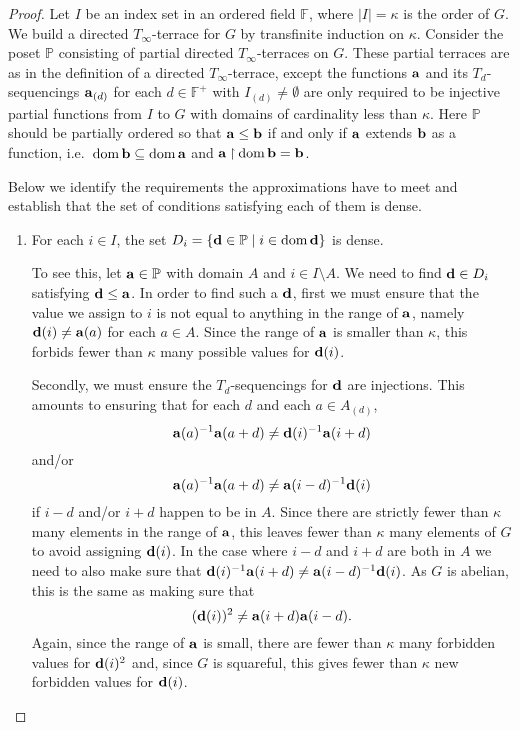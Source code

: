 \documentclass[12pt,a4paper]{article}
\newcommand{\F}{\mathbb{F}}
\DeclareMathOperator{\dom}{dom}
\newcommand{\rest}{\mathbin{\upharpoonright}}
\newcommand{\st}{\; | \;}
\newcommand{\set}[2]{\left\{#1\st #2 \right\}}
\renewcommand{\P}{\mathbb{P}}
\renewcommand{\a}{\textup{\textbf{a}}}
\renewcommand{\b}{\textup{\textbf{b}}}
\renewcommand{\d}{\textup{\textbf{d}}}
\begin{document}
\begin{proof}
Let $I$ be an index set in an ordered field $\F$, where $|I|=\kappa$ is the order of $G$. We build a directed $T_\infty$-terrace for $G$ by transfinite induction on $\kappa$. Consider the poset $\P$ consisting of partial directed $T_\infty$-terraces on $G$. These partial terraces are as in the definition of a directed $T_\infty$-terrace, except the functions $\a$ and its $T_d$-sequencings $\a_{(d)}$ for each $d \in \F^+$ with $I_{(d)} \neq \emptyset$ are only required to be injective partial functions from $I$ to $G$ with domains of cardinality less than $\kappa$. Here $\P$ should be partially ordered so that $\a \leq \b$ if and only if $\a$ extends $\b$ as a function, i.e.\ $\dom \b \subseteq \dom \a$ and $\a \rest \dom \b = \b$.

Below we identify the requirements the approximations have to meet and establish that the set of conditions satisfying each of them is dense.

\begin{enumerate}
	\item \label{item:DomainDense} For each $i \in I$, the set $D_i=\set{\d \in \P}{i \in \dom \d }$ is dense. 
	
	To see this, let $\a \in \P$ with domain $A$ and $i \in I \setminus A$. We need to find $\d \in D_i$ satisfying $\d \leq \a$. In order to find such a $\d$, first we must ensure that the value we assign to $i$ is not equal to anything in the range of $\a$, namely $\d(i) \neq \a(a)$ for each $a \in A$.
	Since the range of \(\a\) is smaller than \(\kappa\), this forbids fewer than \(\kappa\) many possible values for \(\d(i)\).
	
	Secondly, we must ensure the $T_d$-sequencings for $\d$ are injections. This amounts to ensuring that for each \(d\) and each $a \in A_{(d)}$, 
		$$\a(a)^{-1}\a(a+d) \neq \d(i)^{-1}\a(i+d)$$ and/or
		$$\a(a)^{-1}\a(a+d) \neq \a(i-d)^{-1}\d(i)$$ if $i-d$ and/or $i+d$ happen to be in $A$. Since there are strictly fewer than $\kappa$ many elements in the range of $\a$, this leaves fewer than $\kappa$ many elements of $G$ to avoid assigning $\d(i)$.
	In the case where $i-d$ and $i+d$ are both in $A$ we need to also make sure that $\d(i)^{-1}\a(i+d) \neq \a(i-d)^{-1}\d(i)$. As $G$ is abelian, this is the same as making sure that $$(\d(i))^2 \neq \a(i+d)\a(i-d).$$
	Again, since the range of $\a$ is small, there are fewer than $\kappa$ many forbidden
	values for $\d(i)^2$ and, since $G$ is squareful, this gives fewer than $\kappa$ new
	forbidden values for $\d(i)$.
	

\end{enumerate}
\end{proof}
\end{document}
